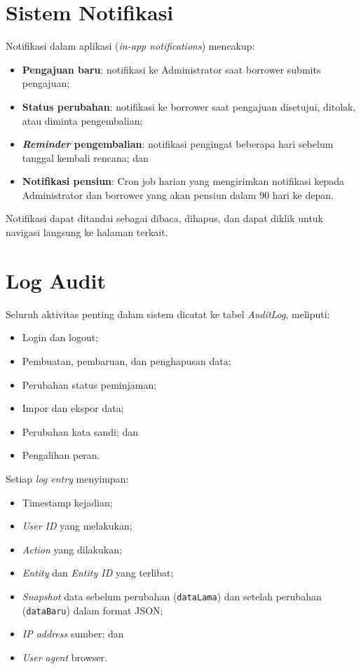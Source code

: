 \documentclass[
  12pt,
  a4paper,
  oneside,
  final
]{report}
\begin{document}
\section{Sistem Notifikasi}

Notifikasi dalam aplikasi ({\it in-app notifications}) mencakup:
\begin{itemize}
  \item {\bfseries Pengajuan baru}: notifikasi ke Administrator
        saat borrower submits pengajuan;
  \item {\bfseries Status perubahan}: notifikasi ke borrower
        saat pengajuan disetujui, ditolak, atau diminta
        pengembalian;
  \item {\bfseries {\it Reminder} pengembalian}: notifikasi
        pengingat beberapa hari sebelum tanggal kembali
        rencana; dan
  \item {\bfseries Notifikasi pensiun}: Cron job harian
        yang mengirimkan notifikasi kepada Administrator
        dan borrower yang akan pensiun dalam 90 hari ke depan.
\end{itemize}

Notifikasi dapat ditandai sebagai dibaca, dihapus, dan
dapat diklik untuk navigasi langsung ke halaman terkait.

\section{Log Audit}

Seluruh aktivitas penting dalam sistem dicatat ke tabel
{\it AuditLog}, meliputi:
\begin{itemize}
  \item Login dan logout;
  \item Pembuatan, pembaruan, dan penghapusan data;
  \item Perubahan status peminjaman;
  \item Impor dan ekspor data;
  \item Perubahan kata sandi; dan
  \item Pengalihan peran.
\end{itemize}

Setiap {\it log entry} menyimpan:
\begin{itemize}
  \item Timestamp kejadian;
  \item {\it User ID} yang melakukan;
  \item {\it Action} yang dilakukan;
  \item {\it Entity} dan {\it Entity ID} yang terlibat;
  \item {\it Snapshot} data sebelum perubahan (\texttt{dataLama})
        dan setelah perubahan (\texttt{dataBaru}) dalam format JSON;
  \item {\it IP address} sumber; dan
  \item {\it User agent} browser.
\end{itemize}
\end{document}
